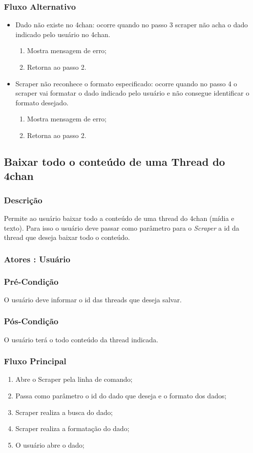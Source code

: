 \subsubsection{Fluxo Alternativo}
\begin{itemize}
    \item Dado não existe no 4chan: ocorre quando no passo 3 scraper não acha o dado indicado pelo usuário no 4chan.
    \begin{enumerate}
        \item Mostra mensagem de erro;
        \item Retorna ao passo 2.
    \end{enumerate}
    \item Scraper não reconhece o formato especificado: ocorre quando no passo 4 o scraper vai formatar o dado indicado pelo usuário e não consegue identificar o formato desejado.
    \begin{enumerate}
        \item Mostra mensagem de erro;
        \item Retorna ao passo 2.
    \end{enumerate}
\end{itemize}

\subsection{Baixar todo o conteúdo de uma Thread do 4chan}
\subsubsection{Descrição}
Permite ao usuário baixar todo a conteúdo de uma thread do 4chan (mídia e texto). Para isso o usuário deve passar como parâmetro para o \textit{Scraper} a id da thread que deseja baixar todo o conteúdo.
\subsubsection{Atores : Usuário}
\subsubsection{Pré-Condição}
O usuário deve informar o id das threads que deseja salvar.
\subsubsection{Pós-Condição}
O usuário terá o todo conteúdo da thread indicada.
\subsubsection{Fluxo Principal}
\begin{enumerate}
    \item Abre o Scraper pela linha de comando;
    \item Passa como parâmetro o id do dado que deseja e o formato dos dados;
    \item Scraper realiza a busca do dado;
    \item Scraper realiza a formatação do dado;
    \item O usuário abre o dado;
\end{enumerate}
